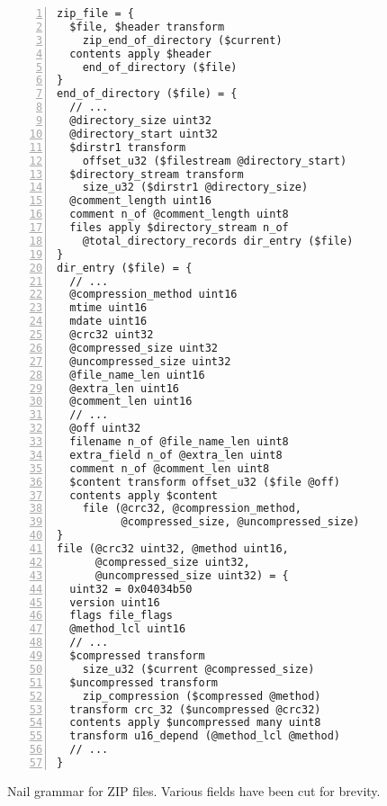 \begin{figure}
\smaller[0.5]
\begin{Verbatim}[numbers=left]
zip_file = { 
  $file, $header transform 
    zip_end_of_directory ($current)
  contents apply $header
    end_of_directory ($file)
}
end_of_directory ($file) = {
  // ...
  @directory_size uint32 
  @directory_start uint32
  $dirstr1 transform
    offset_u32 ($filestream @directory_start)
  $directory_stream transform
    size_u32 ($dirstr1 @directory_size)
  @comment_length uint16
  comment n_of @comment_length uint8
  files apply $directory_stream n_of 
    @total_directory_records dir_entry ($file)
}
dir_entry ($file) = {
  // ...
  @compression_method uint16      
  mtime uint16
  mdate uint16
  @crc32 uint32
  @compressed_size uint32
  @uncompressed_size uint32
  @file_name_len uint16
  @extra_len uint16
  @comment_len uint16
  // ...
  @off uint32
  filename n_of @file_name_len uint8
  extra_field n_of @extra_len uint8
  comment n_of @comment_len uint8
  $content transform offset_u32 ($file @off)
  contents apply $content
    file (@crc32, @compression_method,
          @compressed_size, @uncompressed_size)
}
file (@crc32 uint32, @method uint16,
      @compressed_size uint32,
      @uncompressed_size uint32) = {
  uint32 = 0x04034b50
  version uint16
  flags file_flags
  @method_lcl uint16
  // ...
  $compressed transform
    size_u32 ($current @compressed_size)
  $uncompressed transform
    zip_compression ($compressed @method)
  transform crc_32 ($uncompressed @crc32)
  contents apply $uncompressed many uint8
  transform u16_depend (@method_lcl @method)
  // ...
}
\end{Verbatim}
\caption{Nail grammar for ZIP files. Various fields have been cut for brevity.}
\label{fig:zip-extract}
\end{figure}
